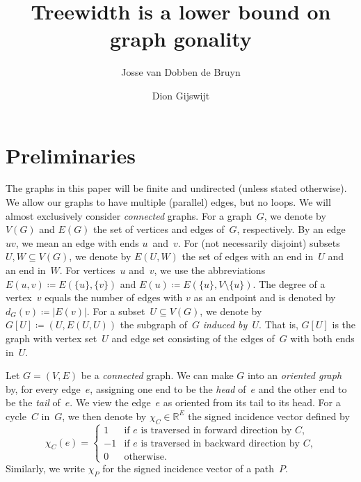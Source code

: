 \documentclass[10pt]{amsart}
\newcommand{\R}{\ensuremath{\mathbb{R}}}
\begin{document}
\title{Treewidth is a lower bound on graph gonality}\author{Josse van Dobben de Bruyn}\author{Dion Gijswijt}\date{}\maketitle\setcounter{section}{1}
\section{Preliminaries} 
The graphs in this paper will be finite and undirected (unless stated otherwise). We allow our graphs to have multiple (parallel) edges, but no loops. We will almost exclusively consider \emph{connected} graphs. For a graph~$G$, we denote by $V(G)$ and $E(G)$ the set of vertices and edges of~$G$, respectively. By an edge~$uv$, we mean an edge with ends $u$~and~$v$. For (not necessarily disjoint) subsets~$U,W\subseteq V(G)$, we denote by $E(U,W)$ the set of edges with an end in~$U$ and an end in~$W$. For vertices~$u$ and~$v$, we use the abbreviations $E(u,v)\coloneqq E(\{u\},\{v\})$ and $E(u)\coloneqq E(\{u\},V\setminus \{u\})$. The degree of a vertex~$v$ equals the number of edges with $v$ as an endpoint and is denoted by $d_G(v)\coloneqq |E(v)|$. For a subset~$U\subseteq V(G)$, we denote by $G[U]\coloneqq (U,E(U,U))$ the subgraph of~$G$ \emph{induced by~$U$}. That is, $G[U]$ is the graph with vertex set~$U$ and edge set consisting of the edges of~$G$ with both ends in~$U$.

Let $G=(V,E)$ be a \emph{connected} graph. We can make $G$ into an \emph{oriented graph} by, for every edge~$e$, assigning one end to be the \emph{head} of~$e$ and the other end to be the \emph{tail} of~$e$. We view the edge~$e$ as oriented from its tail to its head. For a cycle~$C$ in~$G$, we then denote by $\chi_C\in \R^{E}$ the signed incidence vector defined by
\begin{equation}
\chi_C(e)=\begin{cases}
1& \text{if $e$ is traversed in forward direction by $C$,}\\
-1&\text{if $e$ is traversed in backward direction by $C$,}\\
0&\text{otherwise.}
\end{cases}
\end{equation} 
Similarly, we write $\chi_P$ for the signed incidence vector of a path~$P$.
\end{document}
